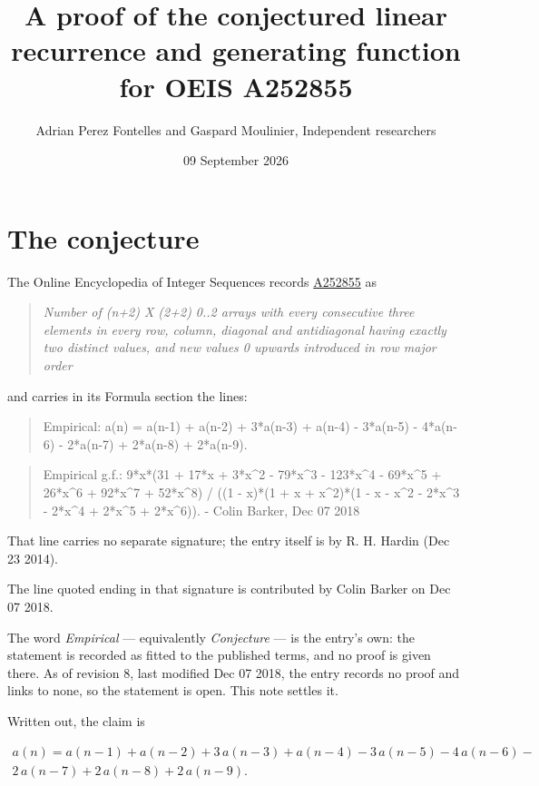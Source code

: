\documentclass[11pt]{article}
\title{A proof of the conjectured linear recurrence and generating function for OEIS A252855}
\author{Adrian Perez Fontelles and Gaspard Moulinier, Independent researchers}
\date{09 September 2026}
\theoremstyle{definition}
\begin{document}
\maketitle
\section{The conjecture}

The Online Encyclopedia of Integer Sequences records \href{https://oeis.org/A252855}{A252855} as

\begin{quote}\itshape Number of (n+2) X (2+2) 0..2 arrays with every consecutive three elements in every row, column, diagonal and antidiagonal having exactly two distinct values, and new values 0 upwards introduced in row major order\end{quote}

and carries in its Formula section the lines:

\begin{quote}\ttfamily Empirical: a(n) = a(n-1) + a(n-2) + 3*a(n-3) + a(n-4) - 3*a(n-5) - 4*a(n-6) - 2*a(n-7) + 2*a(n-8) + 2*a(n-9).\end{quote}

\begin{quote}\ttfamily Empirical g.f.: 9*x*(31 + 17*x + 3*x\textasciicircum{}2 - 79*x\textasciicircum{}3 - 123*x\textasciicircum{}4 - 69*x\textasciicircum{}5 + 26*x\textasciicircum{}6 + 92*x\textasciicircum{}7 + 52*x\textasciicircum{}8) / ((1 - x)*(1 + x + x\textasciicircum{}2)*(1 - x - x\textasciicircum{}2 - 2*x\textasciicircum{}3 - 2*x\textasciicircum{}4 + 2*x\textasciicircum{}5 + 2*x\textasciicircum{}6)). - Colin Barker, Dec 07 2018\end{quote}

That line carries no separate signature; the entry itself is by R. H. Hardin (Dec 23 2014).

The line quoted ending in that signature is contributed by Colin Barker on Dec 07 2018.

The word {\itshape Empirical} --- equivalently {\itshape Conjecture} --- is the entry's own: the statement is recorded as fitted to the published terms, and no proof is given there. As of revision 8, last modified Dec 07 2018, the entry records no proof and links to none, so the statement is open. This note settles it.

Written out, the claim is

\begin{multline*} a(n) = a(n-1) + a(n-2) + 3\,a(n-3) + a(n-4) - 3\,a(n-5) - 4\,a(n-6) - \\ 2\,a(n-7) + 2\,a(n-8) + 2\,a(n-9). \end{multline*}
\end{document}
